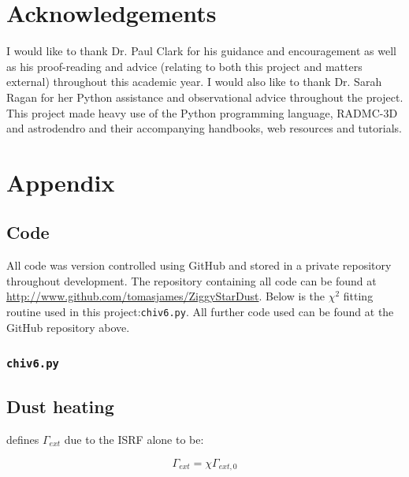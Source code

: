 \documentclass{report}
\begin{document}

\chapter{Acknowledgements}
I would like to thank Dr. Paul Clark for his guidance and encouragement as well as his proof-reading and advice (relating to both this project and matters external) throughout this academic year. I would also like to thank Dr. Sarah Ragan for her Python assistance and observational advice throughout the project. This project made heavy use of the Python programming language, RADMC-3D and astrodendro and their accompanying handbooks, web resources and tutorials.


\chapter{Appendix}

\section*{Code}
All code was version controlled using GitHub and stored in a private repository throughout development. The repository containing all code can be found at \href{http://www.github.com/tomasjames/ZiggyStarDust}{http://www.github.com/tomasjames/ZiggyStarDust}. Below is the $\chi^{2}$ fitting routine used in this project:\texttt{chiv6.py}. All further code used can be found at the GitHub repository above.

\subsection*{\texttt{chiv6.py}}


\section*{Dust heating}
\textcite{treecol} defines $\Gamma_{ext}$ due to the ISRF alone to be:

\begin{equation}
  \Gamma_{ext} = \chi \Gamma_{ext,0}
\end{equation}
\end{document}
